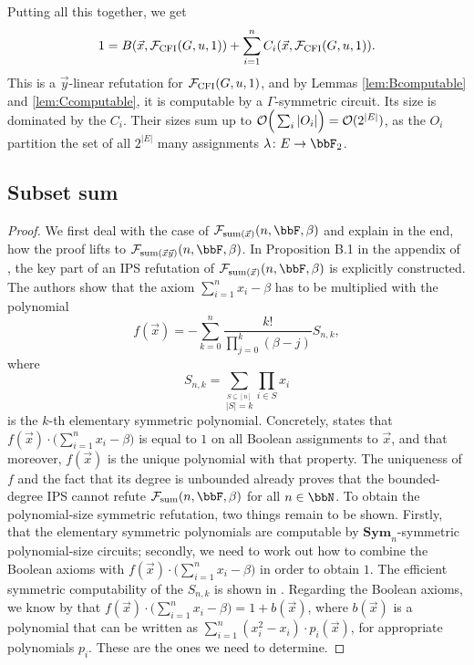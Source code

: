 \documentclass[10pt,a4paper]{article}
\newcommand{\Sym}{{\mathbf{Sym}}}
\newcommand{\Ff}{{\cal F}}
\newcommand{\Oo}{{\cal O}}
\newcommand{\CFI}{\Ff_{\mathrm{CFI}}}
\begin{document}
Putting all this together, we get
\[
1 = B(\vec x, \CFI(G,u,1)) + \sum_{i=1}^n C_i(\vec x,  \CFI(G,u,1)).
\]	
This is a $\vec y$-linear refutation for $\CFI(G,u,1)$, and by Lemmas \ref{lem:Bcomputable} and \ref{lem:Ccomputable}, it is computable by a $\Gamma$-symmetric circuit. Its size is dominated by the $C_i$. Their sizes sum up to $\Oo\Big(\sum_i |O_i| \Big) = \Oo(2^{|E|})$, as the $O_i$ partition the set of all $2^{|E|}$ many assignments $\lambda \colon E \to \bbF_2$.





\subsection{Subset sum}
\subsetsumUpperBound*
\begin{proof}
	We first deal with the case of $\Ff_{\text{sum}(\vec x)}(n,\bbF,\beta)$ and explain in the end, how the proof lifts to $\Ff_{\text{sum}(\vec x \vec y)}(n,\bbF,\beta)$. 
	In Proposition B.1 in the appendix of \cite{lowerbounds_IPS}, the key part of an IPS refutation
	of $\Ff_{\text{sum}(\vec x)}(n,\bbF,\beta)$ is explicitly constructed. The authors show that the axiom 	$\sum_{i=1}^n x_i - \beta$ has to be multiplied with the polynomial
	\[
	f(\vec x) = - \sum_{k=0}^n \frac{k!}{\prod_{j=0}^k (\beta -j)} S_{n,k},
	\]
	where \[
	S_{n,k} = \sum_{\stackrel{S \subseteq [n]}{|S| = k}} \prod_{i \in S} x_i
	\] is the $k$-th elementary symmetric polynomial. Concretely, \cite[Proposition B.1]{lowerbounds_IPS} states that $f(\vec x) \cdot \Big(\sum_{i=1}^n x_i - \beta \Big)$ is equal to $1$ on all Boolean assignments to $\vec x$, and that moreover, $f(\vec x)$ is the unique polynomial with that property. The uniqueness of $f$ and the fact that its degree is unbounded already proves that the bounded-degree IPS cannot refute $\Ff_{\text{sum}}(n,\bbF,\beta)$ for all $n \in \bbN$. To obtain the polynomial-size symmetric refutation, two things remain to be shown. Firstly, that the elementary symmetric polynomials are computable by $\Sym_n$-symmetric polynomial-size circuits; secondly, we need to work out how to combine the Boolean axioms with 
	$f(\vec x) \cdot \Big(\sum_{i=1}^n x_i - \beta \Big)$ in order to obtain $1$. The efficient symmetric computability of the $S_{n,k}$ is shown in \cite{shpilka2001depth}. 
	Regarding the Boolean axioms, we know by \cite[Proposition B.1]{lowerbounds_IPS} that $f(\vec x) \cdot \Big(\sum_{i=1}^n x_i - \beta \Big) = 1 + b(\vec x)$, where $b(\vec x)$ is a polynomial that can be written as $\sum_{i=1}^n (x_i^2 -x_i) \cdot p_i(\vec x)$, for appropriate polynomials $p_i$. These are the ones we need to determine. 

\end{proof}
\end{document}

